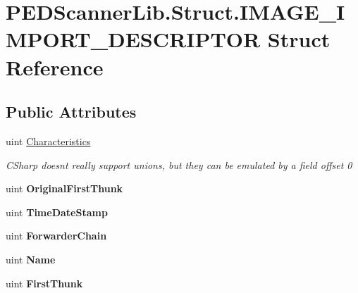 \hypertarget{struct_p_e_d_scanner_lib_1_1_struct_1_1_i_m_a_g_e___i_m_p_o_r_t___d_e_s_c_r_i_p_t_o_r}{}\section{P\+E\+D\+Scanner\+Lib.\+Struct.\+I\+M\+A\+G\+E\+\_\+\+I\+M\+P\+O\+R\+T\+\_\+\+D\+E\+S\+C\+R\+I\+P\+T\+OR Struct Reference}
\label{struct_p_e_d_scanner_lib_1_1_struct_1_1_i_m_a_g_e___i_m_p_o_r_t___d_e_s_c_r_i_p_t_o_r}
\subsection*{Public Attributes}
\begin{DoxyCompactItemize}
\item 
uint \mbox{\hyperlink{struct_p_e_d_scanner_lib_1_1_struct_1_1_i_m_a_g_e___i_m_p_o_r_t___d_e_s_c_r_i_p_t_o_r_a0c18d74dd3bc723eae566f0a1bc51054}{Characteristics}}
\begin{DoxyCompactList}\small\item\em C\+Sharp doesnt really support unions, but they can be emulated by a field offset 0 \end{DoxyCompactList}\item 
\mbox{\label{struct_p_e_d_scanner_lib_1_1_struct_1_1_i_m_a_g_e___i_m_p_o_r_t___d_e_s_c_r_i_p_t_o_r_af730d76021d35154d21bcba1671283cb}} 
uint {\bfseries Original\+First\+Thunk}
\item 
\mbox{\label{struct_p_e_d_scanner_lib_1_1_struct_1_1_i_m_a_g_e___i_m_p_o_r_t___d_e_s_c_r_i_p_t_o_r_a4818581702161fa3bf34032c775137f8}} 
uint {\bfseries Time\+Date\+Stamp}
\item 
\mbox{\label{struct_p_e_d_scanner_lib_1_1_struct_1_1_i_m_a_g_e___i_m_p_o_r_t___d_e_s_c_r_i_p_t_o_r_a64a108b3ae62d49bde6c938fe62087b8}} 
uint {\bfseries Forwarder\+Chain}
\item 
\mbox{\label{struct_p_e_d_scanner_lib_1_1_struct_1_1_i_m_a_g_e___i_m_p_o_r_t___d_e_s_c_r_i_p_t_o_r_a85fab8c9baaabaf68abf29990ee45154}} 
uint {\bfseries Name}
\item 
\mbox{\label{struct_p_e_d_scanner_lib_1_1_struct_1_1_i_m_a_g_e___i_m_p_o_r_t___d_e_s_c_r_i_p_t_o_r_a0ab29fb221b3a06d4d740ea25e05ed2b}} 
uint {\bfseries First\+Thunk}
\end{DoxyCompactItemize}


